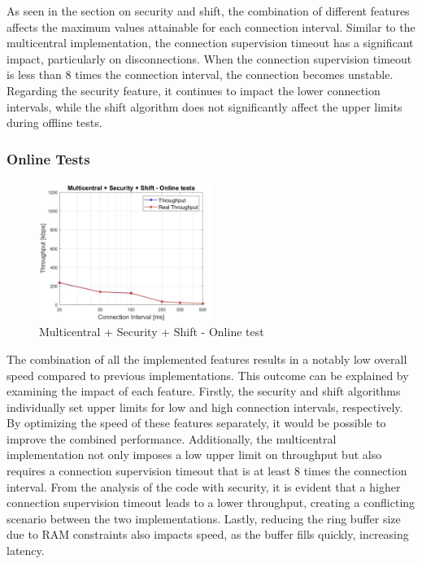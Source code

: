 \documentclass{Configuration_Files/PoliMi3i_thesis}
\begin{document}
As seen in the section on security and shift, the combination of different features affects the maximum values attainable for each connection interval. Similar to the multicentral implementation, the connection supervision timeout has a significant impact, particularly on disconnections. When the connection supervision timeout is less than 8 times the connection interval, the connection becomes unstable. Regarding the security feature, it continues to impact the lower connection intervals, while the shift algorithm does not significantly affect the upper limits during offline tests.

\subsubsection*{Online Tests}

\begin{figure}[H]
    \centering
    \includegraphics[width=0.5\textwidth]{Results Manuel/figure31}
    \caption{Multicentral + Security + Shift - Online test}
    \label{manuel_results_31}
\end{figure}

The combination of all the implemented features results in a notably low overall speed compared to previous implementations. This outcome can be explained by examining the impact of each feature. Firstly, the security and shift algorithms individually set upper limits for low and high connection intervals, respectively. By optimizing the speed of these features separately, it would be possible to improve the combined performance. Additionally, the multicentral implementation not only imposes a low upper limit on throughput but also requires a connection supervision timeout that is at least 8 times the connection interval. From the analysis of the code with security, it is evident that a higher connection supervision timeout leads to a lower throughput, creating a conflicting scenario between the two implementations. Lastly, reducing the ring buffer size due to RAM constraints also impacts speed, as the buffer fills quickly, increasing latency.
\end{document}
